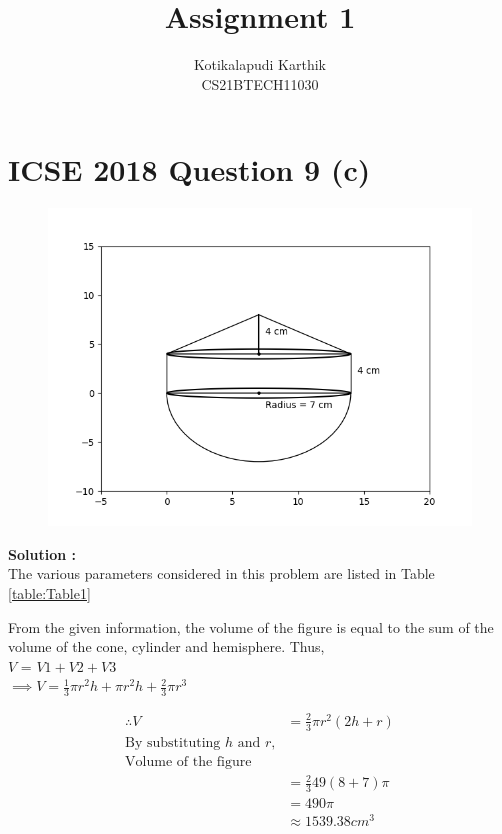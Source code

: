 \documentclass[journal,12pt,twocolumn]{IEEEtran}
\title{Assignment 1}
\author{Kotikalapudi Karthik \\
CS21BTECH11030}
\begin{document}
\maketitle

\section*{ICSE 2018 Question 9 (c)}
\begin{figure}[ht!]
	  \centering 
	  \includegraphics[width=\columnwidth]{question9c.png}
\end{figure}
\textbf{Solution :}\\
The various parameters considered in this problem are listed in Table
\eqref{table:Table1}
\begin{table}[ht!]
    \centering
    
    \caption{}
    \label{table:Table1}
\end{table}

From the given information, the volume of the figure is equal to the sum of the volume of the cone, cylinder and hemisphere. Thus,\\
$V$ = $V1 + V2 + V3$\\
$\implies V = \frac{1}{3} \pi r^2 h + \pi r^2 h + \frac{2}{3} \pi r^3$

\begin{align*}
    \therefore V&= \frac{2}{3} \pi r^2 (2h+r)\\
    \text{By substituting $h$ and $r$,}\\
    \text{Volume of the figure}\\
    &= \frac{2}{3} 49 (8+7) \pi\\
    &= 490 \pi\\ 
    &\approx 1539.38cm^3
\end{align*}
\end{document}
